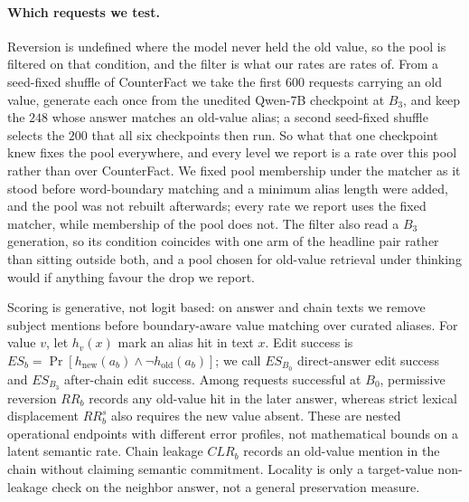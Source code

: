 \documentclass[letterpaper]{article} %
\begin{document}
\paragraph{Which requests we test.}  Reversion is undefined where the model never held the old value, so the pool is filtered on that condition, and the filter is what our rates are rates of.  From a seed-fixed shuffle of CounterFact we take the first \(600\) requests carrying an old value, generate each once from the unedited Qwen-7B checkpoint at \(B_3\), and keep the \(248\) whose answer matches an old-value alias; a second seed-fixed shuffle selects the \(200\) that all six checkpoints then run.  So what that one checkpoint knew fixes the pool everywhere, and every level we report is a rate over this pool rather than over CounterFact.  We fixed pool membership under the matcher as it stood before word-boundary matching and a minimum alias length were added, and the pool was not rebuilt afterwards; every rate we report uses the fixed matcher, while membership of the pool does not.  The filter also read a \(B_3\) generation, so its condition coincides with one arm of the headline pair rather than sitting outside both, and a pool chosen for old-value retrieval under thinking would if anything favour the drop we report. %

Scoring is generative, not logit based: on answer and chain texts we remove subject mentions before boundary-aware value matching over curated aliases.  For value \(v\), let \(h_v(x)\) mark an alias hit in text \(x\).  Edit success is
\(ES_b=\Pr[h_{\mathrm{new}}(a_b)\land\neg h_{\mathrm{old}}(a_b)]\); we call \(ES_{B_0}\) direct-answer edit success and \(ES_{B_3}\) after-chain edit success.
Among requests successful at \(B_0\), permissive reversion \(RR_b\) records any old-value hit in the later answer, whereas strict lexical displacement \(RR^s_b\) also requires the new value absent.  These are nested operational endpoints with different error profiles, not mathematical bounds on a latent semantic rate.  Chain leakage \(CLR_b\) records an old-value mention in the chain without claiming semantic commitment.  Locality is only a target-value non-leakage check on the neighbor answer, not a general preservation measure.
\end{document}

